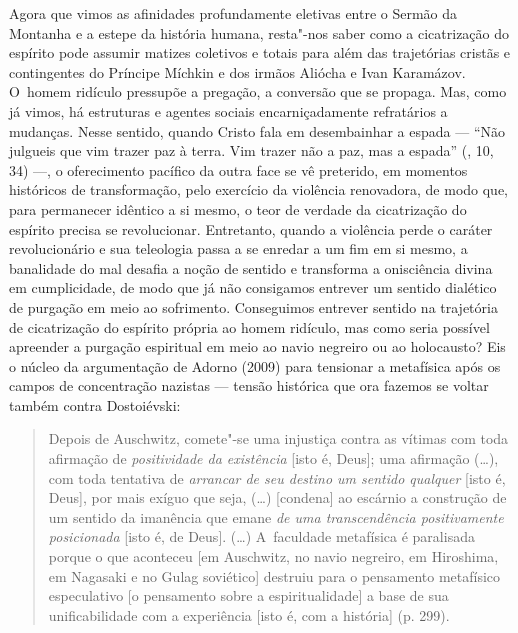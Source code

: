 Agora que vimos as afinidades profundamente eletivas entre o Sermão da
Montanha e a estepe da história humana, resta"-nos saber como a
cicatrização do espírito pode assumir matizes coletivos e totais para
além das trajetórias cristãs e contingentes do Príncipe Míchkin e dos
irmãos Aliócha e Ivan Karamázov. O~homem ridículo pressupõe a pregação,
a conversão que se propaga. Mas, como já vimos, há estruturas e agentes
sociais encarniçadamente refratários a mudanças. Nesse sentido, quando
Cristo fala em desembainhar a espada --- ``Não julgueis que vim trazer
paz à terra. Vim trazer não a paz, mas a espada'' (, 10, 34) ---, o
oferecimento pacífico da outra face se vê preterido, em momentos
históricos de transformação, pelo exercício da violência renovadora, de
modo que, para permanecer idêntico a si mesmo, o teor de verdade da
cicatrização do espírito precisa se revolucionar. Entretanto, quando a
violência perde o caráter revolucionário e sua teleologia passa a se
enredar a um fim em si mesmo, a banalidade do mal desafia a noção de
sentido e transforma a onisciência divina em cumplicidade, de modo que
já não consigamos entrever um sentido dialético de purgação em meio ao
sofrimento. Conseguimos entrever sentido na trajetória de cicatrização
do espírito própria ao homem ridículo, mas como seria possível apreender
a purgação espiritual em meio ao navio negreiro ou ao holocausto? Eis o
núcleo da argumentação de Adorno (2009) para tensionar a metafísica após
os campos de concentração nazistas --- tensão histórica que ora fazemos
se voltar também contra Dostoiévski:

\begin{quote}
Depois de Auschwitz, comete"-se uma injustiça contra as vítimas com toda
afirmação de \emph{positividade da existência} {[}isto é, Deus{]}; uma
afirmação (\ldots{}), com toda tentativa de \emph{arrancar de seu
destino um sentido qualquer} {[}isto é, Deus{]}, por mais exíguo que
seja, (\ldots{}) {[}condena{]} ao escárnio a construção de um sentido da
imanência que emane \emph{de uma transcendência positivamente
posicionada} {[}isto é, de Deus{]}. (\ldots{}) A~faculdade metafísica é
paralisada porque o que aconteceu {[}em Auschwitz, no navio negreiro, em
Hiroshima, em Nagasaki e no Gulag soviético{]} destruiu para o
pensamento metafísico especulativo {[}o pensamento sobre a
espiritualidade{]} a base de sua unificabilidade com a experiência
{[}isto é, com a história{]} (p. 299).
\end{quote}

